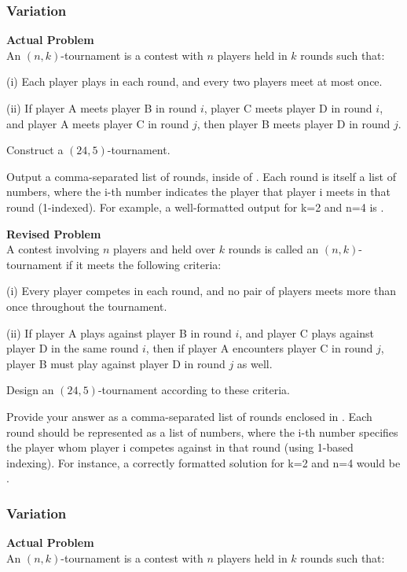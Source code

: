 \subsubsection{Variation}
\textbf{Actual Problem}\\
An $(n, k)$-tournament is a contest with $n$ players held in $k$ rounds such that:

(i) Each player plays in each round, and every two players meet at most once.

(ii) If player A meets player B in round $i$, player C meets player D in round $i$, and player A
meets player C in round $j$, then player B meets player D in round $j$.

Construct a $(24, 5)$-tournament. 


Output a comma-separated list of rounds, inside of \boxed. Each round is itself a list of numbers, where the i-th number indicates the player that player i meets in that round (1-indexed). For example, a well-formatted output for k=2 and n=4 is .

\textbf{Revised Problem}\\
A contest involving $n$ players and held over $k$ rounds is called an $(n, k)$-tournament if it meets the following criteria:

(i) Every player competes in each round, and no pair of players meets more than once throughout the tournament.

(ii) If player A plays against player B in round $i$, and player C plays against player D in the same round $i$, then if player A encounters player C in round $j$, player B must play against player D in round $j$ as well.

Design an $(24, 5)$-tournament according to these criteria.

Provide your answer as a comma-separated list of rounds enclosed in \boxed. Each round should be represented as a list of numbers, where the i-th number specifies the player whom player i competes against in that round (using 1-based indexing). For instance, a correctly formatted solution for k=2 and n=4 would be .

\subsubsection{Variation}
\textbf{Actual Problem}\\
An $(n, k)$-tournament is a contest with $n$ players held in $k$ rounds such that:

